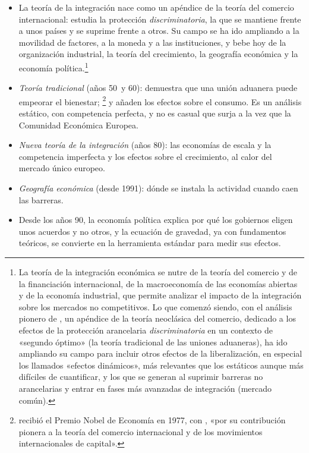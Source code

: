 \documentclass[11pt]{article}
\begin{document}
\begin{itemize}
\begin{itemize}
  \begin{itemize}
  \item La teoría de la integración nace como un apéndice de la teoría del comercio internacional: estudia la protección \emph{discriminatoria}, la que se mantiene frente a unos países y se suprime frente a otros. Su campo se ha ido ampliando a la movilidad de factores, a la moneda y a las instituciones, y bebe hoy de la organización industrial, la teoría del crecimiento, la geografía económica y la economía política.\footnote{La teoría de la integración económica se nutre de la teoría del comercio y de la financiación internacional, de la macroeconomía de las economías abiertas y de la economía industrial, que permite analizar el impacto de la integración sobre los mercados no competitivos. Lo que comenzó siendo, con el análisis pionero de \textcite{Viner1950Customs}, un apéndice de la teoría neoclásica del comercio, dedicado a los efectos de la protección arancelaria \emph{discriminatoria} en un contexto de «segundo óptimo» (la teoría tradicional de las uniones aduaneras), ha ido ampliando su campo para incluir otros efectos de la liberalización, en especial los llamados «efectos dinámicos», más relevantes que los estáticos aunque más difíciles de cuantificar, y los que se generan al suprimir barreras no arancelarias y entrar en fases más avanzadas de integración (mercado común).}
  \item \emph{Teoría tradicional} (años 50~y 60): \textcite{Viner1950Customs} demuestra que una unión aduanera puede empeorar el bienestar; \textcite{Meade1955Customs}\footnote{ recibió el Premio Nobel de Economía en 1977, con , «por su contribución pionera a la teoría del comercio internacional y de los movimientos internacionales de capital»\nocite{Nobel1977MeadeOhlin}.} y \textcite{Lipsey1957Theory} añaden los efectos sobre el consumo. Es un análisis estático, con competencia perfecta, y no es casual que surja a la vez que la Comunidad Económica Europea.
  \item \emph{Nueva teoría de la integración} (años 80): las economías de escala y la competencia imperfecta\nocite{Corden1972Economies,Krugman1979Increasing} y los efectos sobre el crecimiento\nocite{Baldwin1989Growth}, al calor del mercado único europeo.
  \item \emph{Geografía económica} (desde 1991): dónde se instala la actividad cuando caen las barreras\nocite{Krugman1991Increasing}.
  \item Desde los años 90, la economía política explica por qué los gobiernos eligen unos acuerdos y no otros\nocite{GrossmanHelpman1995Politics}, y la ecuación de gravedad, ya con fundamentos teóricos, se convierte en la herramienta estándar para medir sus efectos\nocite{AndersonVanWincoop2003}.

\end{itemize}
\end{itemize}
\end{itemize}
\end{document}

